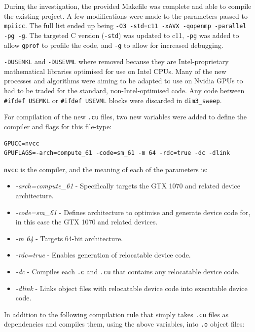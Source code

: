 \documentclass[conference]{IEEEtran}
\begin{document}
During the investigation, the provided Makefile was complete and able to compile the existing project. A few modifications were made to the parameters passed to \texttt{mpiicc}. The full list ended up being \texttt{-O3 -std=c11 -xAVX -qopenmp -parallel -pg -g}. The targeted C version (\texttt{-std}) was updated to c11, \texttt{-pg} was added to allow \texttt{gprof} to profile the code, and \texttt{-g} to allow for increased debugging.

\texttt{-DUSEMKL} and \texttt{-DUSEVML} where removed because they are Intel-proprietary mathematical libraries optimised for use on Intel CPUs. Many of the new processes and algorithms were aiming to be adapted to use on Nvidia GPUs to had to be traded for the standard, non-Intel-optimised code. Any code between \texttt{\#ifdef USEMKL} or \texttt{\#ifdef USEVML} blocks were discarded in \texttt{dim3\_sweep}.

For compilation of the new \texttt{.cu} files, two new variables were added to define the compiler and flags for this file-type:

\begin{lstlisting}[breaklines]
GPUCC=nvcc
GPUFLAGS=-arch=compute_61 -code=sm_61 -m 64 -rdc=true -dc -dlink
\end{lstlisting}

\texttt{nvcc} is the compiler, and the meaning of each of the parameters is:

\begin{itemize}
    \item \textit{-arch=compute\_61} - Specifically targets the GTX 1070 and related device architecture.
    \item \textit{-code=sm\_61} - Defines architecture to optimise and generate device code for, in this case the GTX 1070 and related devices. 
    \item \textit{-m 64} - Targets 64-bit architecture.
    \item \textit{-rdc=true} - Enables generation of relocatable device code.
    \item \textit{-dc} - Compiles each \texttt{.c} and \texttt{.cu} that contains any relocatable device code.
    \item \textit{-dlink} - Links object files with relocatable device code into executable device code.
\end{itemize}

In addition to the following compilation rule that simply takes \texttt{.cu} files as dependencies and compiles them, using the above variables, into \texttt{.o} object files:
\end{document}
